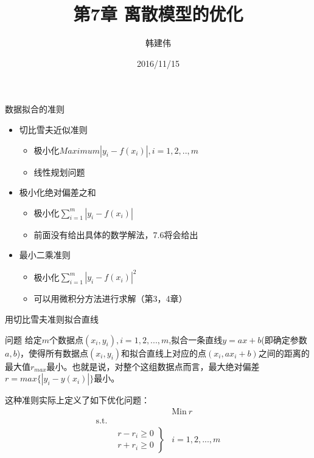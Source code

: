 \documentclass[mathserif, table]{beamer}
\title{第7章 离散模型的优化}
\author{韩建伟}
\institute{
  信息学院\\
  \texttt{mm@hanjianwei.com}
}
\date{2016/11/15}
\begin{document}
\begin{frame}[plain]
  \titlepage{}
\end{frame}

\begin{frame}{数据拟合的准则}

  \begin{itemize}
  \item 切比雪夫近似准则
    \begin{itemize}
    \item 极小化$Maximum |y_i - f(x_i)|,  i = 1, 2, .., m$
    \item 线性规划问题
    \end{itemize}
  \item 极小化绝对偏差之和 
    \begin{itemize}
    \item 极小化$\sum_{i=1}^m |y_i - f(x_i)|$
    \item 前面没有给出具体的数学解法，7.6将会给出
    \end{itemize}
  \item 最小二乘准则 
    \begin{itemize}
    \item 极小化$\sum_{i=1}^m |y_i - f(x_i)|^2$
    \item 可以用微积分方法进行求解（第3，4章）
    \end{itemize}
  \end{itemize}
  
\end{frame}

\begin{frame}{用切比雪夫准则拟合直线}
  \begin{block}{问题}
    给定$m$个数据点$(x_i, y_i), i=1, 2, ..., m$,拟合一条直线$y=ax+b$(即确定参数$a, b$)，使得所有数据点$(x_i, y_i)$和拟合直线上对应的点$(x_i, ax_i+b)$之间的距离的最大值$r_{max}$最小。也就是说，对整个这组数据点而言，最大绝对偏差$r=max\{|y_i-y(x_i)|\}$最小。
  \end{block}

  这种准则实际上定义了如下优化问题：
  \[ 
  \begin{array}{lcl}
    & & \mbox{Min}\ r \\
    \mbox{s.t.} & &  \\
    &
    \left.
      \begin{array}{c}
        r-r_i \ge 0\\
        r+r_i \ge 0
      \end{array}
    \right\}& i = 1, 2, ... , m
  \end{array}
  \]
\end{frame}
\end{document}
